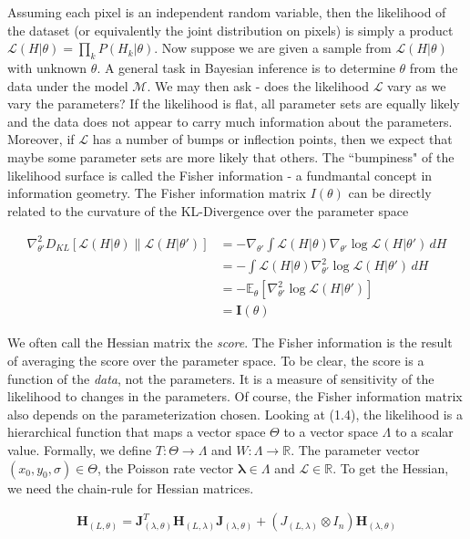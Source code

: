 \documentclass{ucetd}
\begin{document}
Assuming each pixel is an independent random variable, then the likelihood of the dataset (or equivalently the joint distribution on pixels) is simply a product $\mathcal{L}(H|\theta) = \prod_{k}P(H_{k}|\theta)$. Now suppose we are given a sample from $\mathcal{L}(H|\theta)$ with unknown $\theta$. A general task in Bayesian inference is to determine $\theta$ from the data under the model $\mathcal{M}$. We may then ask - does the likelihood $\mathcal{L}$ vary as we vary the parameters? If the likelihood is flat, all parameter sets are equally likely and the data does not appear to carry much information about the parameters. Moreover, if $\mathcal{L}$ has a number of bumps or inflection points, then we expect that maybe some parameter sets are more likely that others. The ``bumpiness" of the likelihood surface is called the Fisher information - a fundmantal concept in information geometry. The Fisher information matrix $I(\theta)$ can be directly related to the curvature of the KL-Divergence over the parameter space

\begin{align*}
\nabla^2_{\theta'} D_{KL}[\mathcal{L}(H|\theta) \parallel \mathcal{L}(H|\theta')] 
&= - \nabla_{\theta'} \int \mathcal{L}(H|\theta) \nabla_{\theta'}  \log \mathcal{L}(H|\theta') \, dH \\ 
&= - \int \mathcal{L}(H|\theta) \nabla^2_{\theta'}  \log \mathcal{L}(H|\theta') \, dH \\
&= - \mathbb{E}_{\theta}[\nabla^2_{\theta'} \log \mathcal{L}(H|\theta')] \\
&= \mathbf{I}(\theta)
\end{align*}


We often call the Hessian matrix the \emph{score}. The Fisher information is the result of averaging the score over the parameter space. To be clear, the score is a function of the \emph{data}, not the parameters. It is a measure of sensitivity of the likelihood to changes in the parameters. Of course, the Fisher information matrix also depends on the parameterization chosen. Looking at (1.4), the likelihood is a hierarchical function that maps a vector space $\Theta$ to a vector space $\Lambda$ to a scalar value. Formally, we define $T: \Theta \rightarrow \Lambda$ and $W: \Lambda \rightarrow \mathbb{R}$. The parameter vector $(x_{0},y_{0},\sigma)\in \Theta$, the Poisson rate vector $\bm{\lambda} \in \Lambda$ and $\mathcal{L} \in \mathbb{R}$. To get the Hessian, we need the chain-rule for Hessian matrices.


\begin{align*}
\mathbf{H}_{(L,\theta)} = \mathbf{J}_{(\lambda,\theta)}^{T} \mathbf{H}_{(L,\lambda)} \mathbf{J}_{(\lambda,\theta)} + (J_{(L,\lambda)}\otimes I_{n})\mathbf{H}_{(\lambda,\theta)}
\end{align*}
\end{document}
